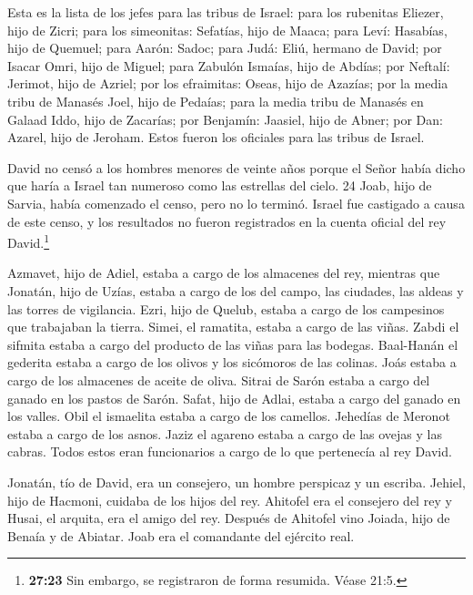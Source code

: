  Esta es la lista de los jefes para las tribus de Israel:
para los rubenitas Eliezer, hijo de Zicri; para los simeonitas:
Sefatías, hijo de Maaca;  para Leví: Hasabías, hijo de
Quemuel; para Aarón: Sadoc;  para Judá: Eliú, hermano de
David; por Isacar Omri, hijo de Miguel;  para Zabulón
Ismaías, hijo de Abdías; por Neftalí: Jerimot, hijo de Azriel;
 por los efraimitas: Oseas, hijo de Azazías; por la media
tribu de Manasés Joel, hijo de Pedaías;  para la media
tribu de Manasés en Galaad Iddo, hijo de Zacarías; por Benjamín:
Jaasiel, hijo de Abner;  por Dan: Azarel, hijo de Jeroham.
Estos fueron los oficiales para las tribus de Israel.

 David no censó a los hombres menores de veinte años porque
el Señor había dicho que haría a Israel tan numeroso como las estrellas
del cielo. 24 Joab, hijo de Sarvia, había comenzado el censo, pero no lo
terminó. Israel fue castigado a causa de este censo, y los resultados no
fueron registrados en la cuenta oficial del rey David.\footnote{\textbf{27:23}
  Sin embargo, se registraron de forma resumida. Véase 21:5.}

 Azmavet, hijo de Adiel, estaba a cargo de los almacenes
del rey, mientras que Jonatán, hijo de Uzías, estaba a cargo de los del
campo, las ciudades, las aldeas y las torres de vigilancia.
 Ezri, hijo de Quelub, estaba a cargo de los campesinos que
trabajaban la tierra.  Simei, el ramatita, estaba a cargo
de las viñas. Zabdi el sifmita estaba a cargo del producto de las viñas
para las bodegas.  Baal-Hanán el gederita estaba a cargo de
los olivos y los sicómoros de las colinas. Joás estaba a cargo de los
almacenes de aceite de oliva.  Sitrai de Sarón estaba a
cargo del ganado en los pastos de Sarón. Safat, hijo de Adlai, estaba a
cargo del ganado en los valles.  Obil el ismaelita estaba a
cargo de los camellos. Jehedías de Meronot estaba a cargo de los asnos.
 Jaziz el agareno estaba a cargo de las ovejas y las
cabras. Todos estos eran funcionarios a cargo de lo que pertenecía al
rey David.

 Jonatán, tío de David, era un consejero, un hombre
perspicaz y un escriba. Jehiel, hijo de Hacmoni, cuidaba de los hijos
del rey.  Ahitofel era el consejero del rey y Husai, el
arquita, era el amigo del rey.  Después de Ahitofel vino
Joiada, hijo de Benaía y de Abiatar. Joab era el comandante del ejército
real.

